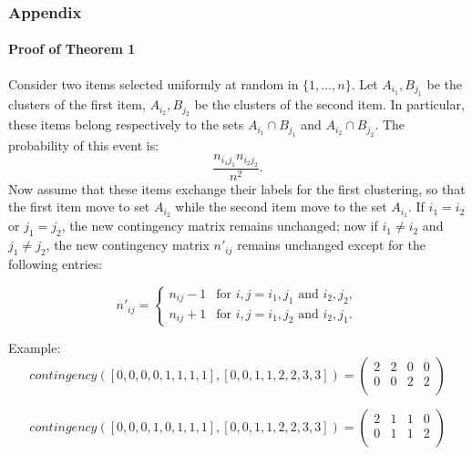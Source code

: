 \documentclass{tum-presentation}
\begin{document}
\begin{frame}
	\frametitle{Appendix}
	\framesubtitle{Proof of Theorem 1}
	
	Consider two  items selected uniformly at random in $\{1,\ldots,n\}$. Let $A_{i_1}, B_{j_1}$ be the clusters of the first item, $A_{i_2}, B_{j_2}$ be the clusters of the second item. In particular, these items belong respectively to the sets $A_{i_1} \cap B_{j_1}$ and $A_{i_2} \cap B_{j_2}$. The probability of this event is:
	$$
	\frac{n_{i_1j_1}n_{i_2j_2}}{n^2}.
	$$
	Now assume that these items exchange their labels for the first clustering, so that the first item move to set $A_{i_2}$ while the second item move to the set $A_{i_1}$.  If $i_1=i_2$ or $j_1= j_2$, the new contingency matrix remains unchanged; now if $i_1\ne i_2$ and $j_1\ne j_2$, the new contingency matrix $n'_{ij}$ remains unchanged except for the following entries:
	
	$$
	n'_{ij} = \left\{\begin{array}{ll}
	n_{ij} - 1 & \text{for }i,j = i_1, j_1 \text{ and } i_2, j_2,\\
	n_{ij} + 1 & \text{for }i,j = i_1, j_2 \text{ and } i_2, j_1.
	\end{array}
	\right.
	$$
	
	Example:
	$$ contingency([0,0,0,0,1,1,1,1], [0,0,1,1,2,2,3,3]) = 
	\begin{pmatrix}
	2 & 2 & 0 & 0 \\
	0 & 0 & 2 & 2 \\
	\end{pmatrix}
	$$
	
	$$ contingency([0,0,0,1,0,1,1,1], [0,0,1,1,2,2,3,3]) = 
	\begin{pmatrix}
	2 & 1 & 1 & 0 \\
	0 & 1 & 1 & 2 \\
	\end{pmatrix}
	$$
	
	
\end{frame}
\end{document}
